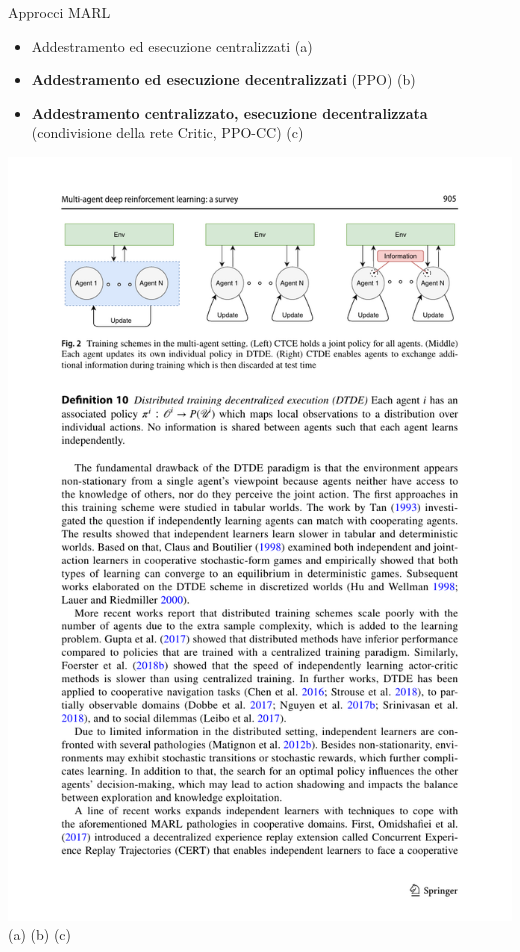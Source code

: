 \documentclass[]{beamer}
\begin{document}
\begin{frame}{Approcci MARL}
    \begin{itemize}
        \item Addestramento ed esecuzione centralizzati (a)

        \item \textbf{Addestramento ed esecuzione decentralizzati} (PPO) (b)

        \item \textbf{Addestramento centralizzato, esecuzione decentralizzata} (condivisione della rete Critic, PPO-CC) (c)
    \end{itemize}

    \medskip

    \centering
    \includegraphics[width=\textwidth]{assets/slides/marl_approaches.pdf}
    (a) \hspace{3.4cm} (b) \hspace{3.5cm} (c)
\end{frame}
\end{document}
